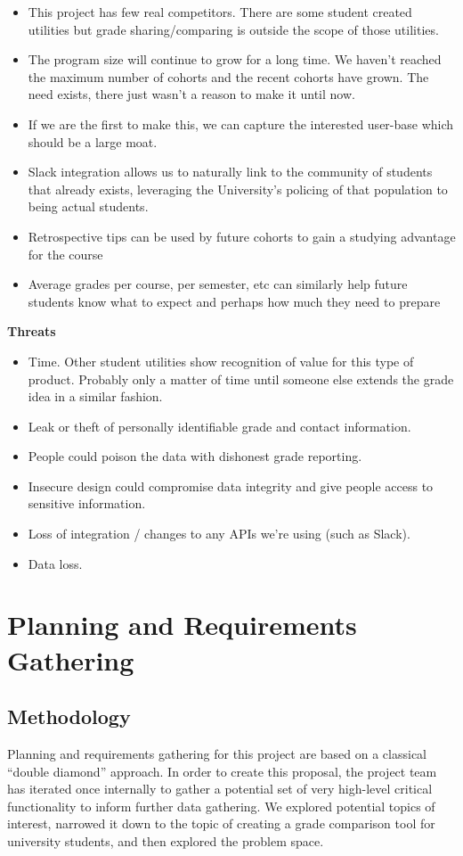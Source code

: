 \begin{itemize}
    \item This project has few real competitors. There are some student created utilities but grade sharing/comparing is outside the scope of those utilities.
    \item The program size will continue to grow for a long time. We haven't reached the maximum number of cohorts and the recent cohorts have grown. The need exists, there just wasn't a reason to make it until now.
    \item If we are the first to make this, we can capture the interested user-base which should be a large moat.
    \item Slack integration allows us to naturally link to the community of students that already exists, leveraging the University's policing of that population to being actual students.
    \item Retrospective tips can be used by future cohorts to gain a studying advantage for the course
    \item Average grades per course, per semester, etc can similarly help future students know what to expect and perhaps how much they need to prepare
\end{itemize}
\textbf{Threats}
\begin{itemize}
    \item Time. Other student utilities show recognition of value for this type of product. Probably only a matter of time until someone else extends the grade idea in a similar fashion.
    \item Leak or theft of personally identifiable grade and contact information.
    \item People could poison the data with dishonest grade reporting.
    \item Insecure design could compromise data integrity and give people access to sensitive information.
    \item Loss of integration / changes to any APIs we're using (such as Slack).
    \item Data loss.
\end{itemize}
\section{Planning and Requirements Gathering}
\subsection{Methodology}
Planning and requirements gathering for this project are based on a classical ``double diamond'' approach. In order to create this proposal, the project team has iterated once internally to gather a potential set of very high-level critical functionality to inform further data gathering. We explored potential topics of interest, narrowed it down to the topic of creating a grade comparison tool for university students, and then explored the problem space.

